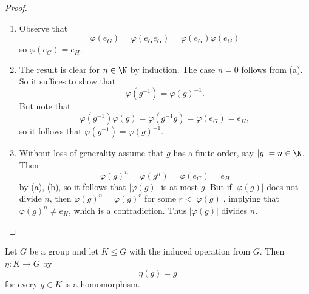 \documentclass[pmath347]{subfiles}
\begin{document}
    \begin{proof}
        \begin{enumerate}
            \item Observe that
                \begin{equation*}
                    \varphi\left( e_G \right) = \varphi\left( e_Ge_G \right) = \varphi\left( e_G \right) \varphi\left( e_G \right) 
                \end{equation*}
                so $\varphi\left( e_G \right) = e_H$. \qqqedsym
            \item The result is clear for $n\in\N$ by induction. The case $n=0$ follows from (a). So it suffices to show that
                \begin{equation*}
                    \varphi\left( g^{-1}  \right) = \varphi\left( g \right) ^{-1} .
                \end{equation*}
                But note that
                \begin{equation*}
                    \varphi\left( g^{-1}  \right) \varphi\left( g \right) = \varphi\left( g^{-1} g \right) = \varphi\left( e_G \right) = e_H,
                \end{equation*}
                so it follows that $\varphi\left( g^{-1}  \right) = \varphi\left( g \right) ^{-1}$. \qqqedsym
            \item Without loss of generality assume that $g$ has a finite order, say $\left| g \right| = n\in\N$. Then 
                \begin{equation*}
                    \varphi\left( g \right) ^n = \varphi\left( g^n \right) = \varphi\left( e_G \right) = e_H
                \end{equation*}
                by (a), (b), so it follows that $\left| \varphi\left( g \right)  \right|$ is at most $g$. But if $\left| \varphi\left( g \right)  \right|$ does not divide $n$, then $\varphi\left( g \right) ^n = \varphi\left( g \right) ^r$ for some $r<\left| \varphi\left( g \right)  \right|$, implying that $\varphi\left( g \right) ^n\neq e_H$, which is a contradiction. Thus $\left| \varphi\left( g \right)  \right|$ divides $n$. \qqedsym
        \end{enumerate}
    \end{proof}

    \begin{prop}{}
        Let $G$ be a group and let $K\leq G$ with the induced operation from $G$. Then $\eta:K\to G$ by
        \begin{equation*}
            \eta\left( g \right) = g
        \end{equation*}
        for every $g\in K$ is a homomorphism.
    \end{prop}
\end{document}

